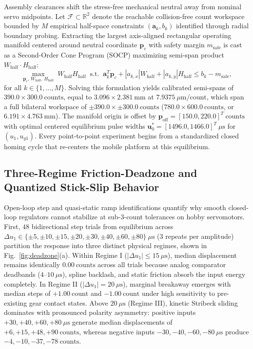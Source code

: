\documentclass[journal]{IEEEtran}
\begin{document}
Assembly clearances shift the stress-free mechanical neutral away from nominal servo midpoints. Let $\mathcal{F} \subset \mathbb{R}^2$ denote the reachable collision-free count workspace bounded by $M$ empirical half-space constraints $(\mathbf{a}_k, b_k)$ identified through radial boundary probing. Extracting the largest axis-aligned rectangular operating manifold centered around neutral coordinate $\mathbf{p}_c$ with safety margin $m_{\text{safe}}$ is cast as a Second-Order Cone Program (SOCP) maximizing semi-span product $W_{\text{half}} \cdot H_{\text{half}}$:
\begin{equation}
\max_{\mathbf{p}_c,\, W_{\text{half}},\, H_{\text{half}}} \; W_{\text{half}} H_{\text{half}} \;\; \text{s.t.} \;\; \mathbf{a}_k^T \mathbf{p}_c + |a_{k,x}| W_{\text{half}} + |a_{k,y}| H_{\text{half}} \le b_k - m_{\text{safe}},
\end{equation}
for all $k \in \{1, \dots, M\}$. Solving this formulation yields calibrated semi-spans of $390.0 \times 300.0\ \text{counts}$, equal to $3.096 \times 2.381\ \text{mm}$ at $7.9375\ \mu\text{m}/\text{count}$, which span a full bilateral workspace of $\pm 390.0 \times \pm 300.0\ \text{counts}$ ($780.0 \times 600.0\ \text{counts}$, or $6.191 \times 4.763\ \text{mm}$). The manifold origin is offset by $\mathbf{p}_{\text{off}} = [150.0, 220.0]^T\ \text{counts}$ with optimal centered equilibrium pulse widths $\mathbf{u}_0^* = [1496.0, 1466.0]^T\ \mu\text{s}$ for $(u_1, u_{y1})$. Every point-to-point experiment begins from a standardized closed homing cycle that re-centers the mobile platform at this equilibrium.

\subsection{Three-Regime Friction-Deadzone and Quantized Stick-Slip Behavior}

Open-loop step and quasi-static ramp identifications quantify why smooth closed-loop regulators cannot stabilize at sub-3-count tolerances on hobby servomotors. First, $48$ bidirectional step trials from equilibrium across $\Delta u_1 \in \{\pm 5, \pm 10, \pm 15, \pm 20, \pm 30, \pm 40, \pm 60, \pm 80\}\ \mu\text{s}$ ($3$ repeats per amplitude) partition the response into three distinct physical regimes, shown in Fig.~\ref{fig:deadzone}(a). Within Regime I ($|\Delta u_1| \le 15\ \mu\text{s}$), median displacement remains identically $0.00\ \text{counts}$ across all trials because analog comparator deadbands ($4\text{--}10\ \mu\text{s}$), spline backlash, and static friction absorb the input energy completely. In Regime II ($|\Delta u_1| = 20\ \mu\text{s}$), marginal breakaway emerges with median steps of $+1.00\ \text{count}$ and $-1.00\ \text{count}$ under high sensitivity to pre-existing gear contact states. Above $20\ \mu\text{s}$ (Regime III), kinetic Stribeck sliding dominates with pronounced polarity asymmetry: positive inputs $+30, +40, +60, +80\ \mu\text{s}$ generate median displacements of $+6, +15, +48, +90\ \text{counts}$, whereas negative inputs $-30, -40, -60, -80\ \mu\text{s}$ produce $-4, -10, -37, -78\ \text{counts}$.
\end{document}
